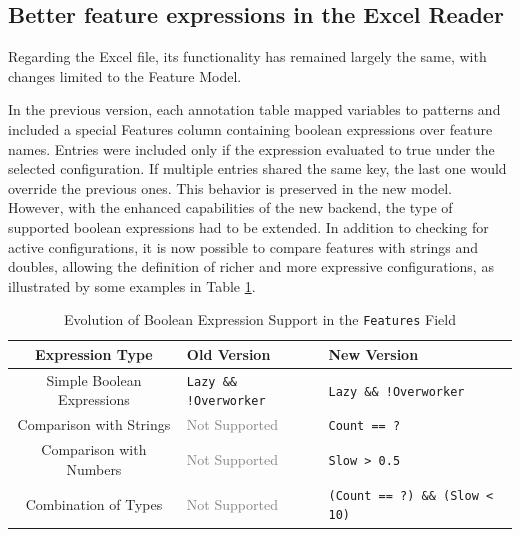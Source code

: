 
   

\subsection{Better feature expressions in the Excel Reader}


Regarding the Excel file, its functionality has remained largely the same, with changes limited to the Feature Model.

In the previous version, each annotation table mapped variables to patterns and included a special Features column containing boolean expressions over feature names. Entries were included only if the expression evaluated to true under the selected configuration. If multiple entries shared the same key, the last one would override the previous ones. This behavior is preserved in the new model. However, with the enhanced capabilities of the new backend, the type of supported boolean expressions had to be extended. In addition to checking for active configurations, it is now possible to compare features with strings and doubles, allowing the definition of richer and more expressive configurations, as illustrated by some examples in Table \ref{tab:bass}.

\begin{table}[H]
\centering
\begin{tabular}{@{}cll@{}}
\hline
\textbf{Expression Type} & \textbf{Old Version} & \textbf{New Version} \\
\hline
Simple Boolean Expressions & \texttt{Lazy \&\& !Overworker} & \texttt{Lazy \&\& !Overworker} \\
\hline
Comparison with Strings & \textcolor{gray}{Not Supported} & \texttt{Count == ?} \\
\hline
Comparison with Numbers & \textcolor{gray}{Not Supported} & \texttt{Slow > 0.5} \\
\hline
Combination of Types & \textcolor{gray}{Not Supported} & \texttt{(Count == ?) \&\& (Slow < 10)} \\
\hline
\end{tabular}
\caption{Evolution of Boolean Expression Support in the \texttt{Features} Field}
\label{tab:bass}
\end{table}

